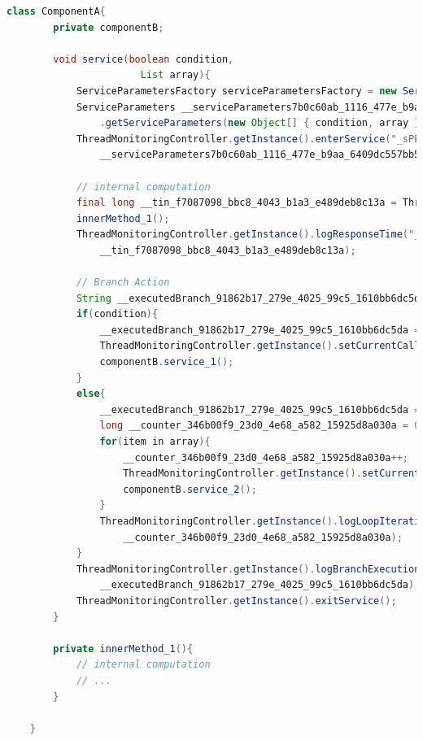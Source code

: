 \begin{lstlisting}[caption={Instrumented version of the source code in Figure \ref{fig:Example of source code and SEFF}, the instrumentation is the result of the execution of our approach},label={lst:instrumented_code}, captionpos=b, language=java] 
  class ComponentA{
        private componentB; 
        
        void service(boolean condition,
                       List array){        
            ServiceParametersFactory serviceParametersFactory = new ServiceParametersFactoryImp();
		    ServiceParameters __serviceParameters7b0c60ab_1116_477e_b9aa_6409dc557bb5 = serviceParametersFactory
				.getServiceParameters(new Object[] { condition, array }, new String[] { "condition", "array" });
		    ThreadMonitoringController.getInstance().enterService("_sPEbUDkyEembGJ6iNCoQDQ",
				__serviceParameters7b0c60ab_1116_477e_b9aa_6409dc557bb5);
                
            // internal computation
            final long __tin_f7087098_bbc8_4043_b1a3_e489deb8c13a = ThreadMonitoringController.getInstance().getTime();
            innerMethod_1();
            ThreadMonitoringController.getInstance().logResponseTime("_tWldADkyEembGJ6iNCoQDQ", "_oro4gG3fEdy4YaaT-RYrLQ",
				__tin_f7087098_bbc8_4043_b1a3_e489deb8c13a);
            
            // Branch Action
            String __executedBranch_91862b17_279e_4025_99c5_1610bb6dc5da = null;            
            if(condition){
                __executedBranch_91862b17_279e_4025_99c5_1610bb6dc5da = "_tXW5EDkyEembGJ6iNCoQDQ";
                ThreadMonitoringController.getInstance().setCurrentCallerId("_tXeN0DkyEembGJ6iNCoQDQ");
                componentB.service_1();
            }
            else{
                __executedBranch_91862b17_279e_4025_99c5_1610bb6dc5da = "_tXW5EDkyEembGJ6iNCoQDQ";
                long __counter_346b00f9_23d0_4e68_a582_15925d8a030a = 0;
                for(item in array){
                    __counter_346b00f9_23d0_4e68_a582_15925d8a030a++;
                    ThreadMonitoringController.getInstance().setCurrentCallerId("_nXeN0DkyHdnbGJ6iNCoQDW");
                    componentB.service_2();
                }
                ThreadMonitoringController.getInstance().logLoopIterationCount("_tXbKgDkyEembGJ6iNCoQDQ",
					__counter_346b00f9_23d0_4e68_a582_15925d8a030a);
            }
            ThreadMonitoringController.getInstance().logBranchExecution("_tXVD4DkyEembGJ6iNCoQDQ",
				__executedBranch_91862b17_279e_4025_99c5_1610bb6dc5da);
            ThreadMonitoringController.getInstance().exitService();   
        }
        
        private innerMethod_1(){
            // internal computation
            // ...
        }
        
    } 
\end{lstlisting}


